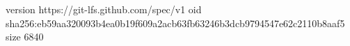 version https://git-lfs.github.com/spec/v1
oid sha256:eb59aa320093b4ea0b19f609a2acb63fb63246b3dcb9794547e62c2110b8aaf5
size 6840
